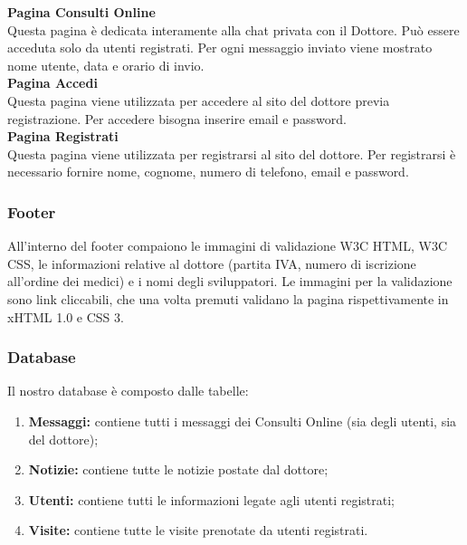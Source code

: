 \textbf{Pagina Consulti Online} \\
Questa pagina è dedicata interamente alla chat privata con il Dottore.
Può essere acceduta solo da utenti registrati.
Per ogni messaggio inviato viene mostrato nome utente, data e orario di invio. \\

\textbf{Pagina Accedi} \\
Questa pagina viene utilizzata per accedere al sito del dottore previa registrazione. Per accedere bisogna inserire email e password. \\

\textbf{Pagina Registrati} \\
Questa pagina viene utilizzata per registrarsi al sito del dottore.  Per registrarsi è necessario fornire nome, cognome, numero di telefono, email e password. \\


\subsubsection{Footer}
All’interno del footer compaiono le immagini di validazione W3C HTML, W3C CSS, le informazioni relative al dottore (partita IVA, numero di iscrizione all’ordine dei medici) e i nomi degli sviluppatori. Le immagini per la validazione sono link cliccabili, che una volta premuti validano la pagina rispettivamente in xHTML 1.0 e CSS 3.

\begin{center}
\end{center}

\pagebreak

\subsubsection{Database}
Il nostro database è composto dalle tabelle:
\begin{enumerate}
\item \textbf{Messaggi:} contiene tutti i messaggi dei Consulti Online (sia degli utenti, sia del dottore);
\item \textbf{Notizie:} contiene tutte le notizie postate dal dottore;
\item \textbf{Utenti:} contiene tutti le informazioni legate agli utenti registrati;
\item \textbf{Visite:} contiene tutte le visite prenotate da utenti registrati.
\end{enumerate}
